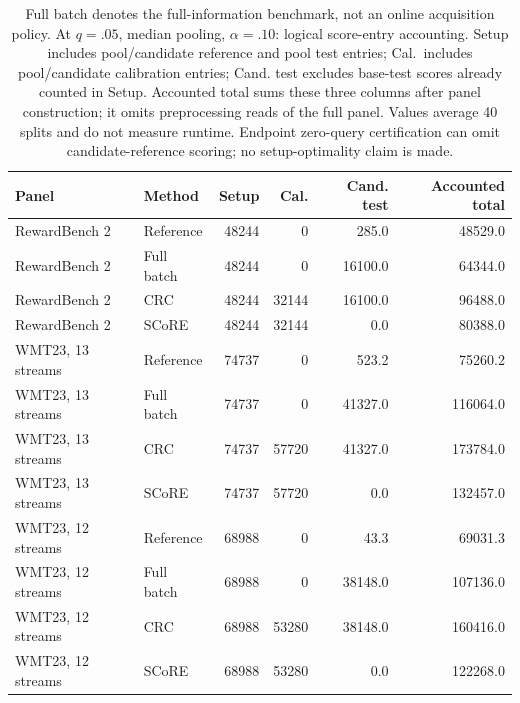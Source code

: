 \begin{table}[t]
\centering\small
\begin{tabular}{llrrrr}
\toprule
Panel & Method & Setup & Cal. & Cand. test & Accounted total \\
\midrule
RewardBench 2 & Reference & 48244 & 0 & 285.0 & 48529.0 \\
RewardBench 2 & Full batch & 48244 & 0 & 16100.0 & 64344.0 \\
RewardBench 2 & CRC & 48244 & 32144 & 16100.0 & 96488.0 \\
RewardBench 2 & SCoRE & 48244 & 32144 & 0.0 & 80388.0 \\
WMT23, 13 streams & Reference & 74737 & 0 & 523.2 & 75260.2 \\
WMT23, 13 streams & Full batch & 74737 & 0 & 41327.0 & 116064.0 \\
WMT23, 13 streams & CRC & 74737 & 57720 & 41327.0 & 173784.0 \\
WMT23, 13 streams & SCoRE & 74737 & 57720 & 0.0 & 132457.0 \\
WMT23, 12 streams & Reference & 68988 & 0 & 43.3 & 69031.3 \\
WMT23, 12 streams & Full batch & 68988 & 0 & 38148.0 & 107136.0 \\
WMT23, 12 streams & CRC & 68988 & 53280 & 38148.0 & 160416.0 \\
WMT23, 12 streams & SCoRE & 68988 & 53280 & 0.0 & 122268.0 \\
\bottomrule
\end{tabular}
\caption{Full batch denotes the full-information benchmark, not an online acquisition policy. At $q=.05$, median pooling, $\alpha=.10$: logical score-entry accounting. Setup includes pool/candidate reference and pool test entries; Cal.\ includes pool/candidate calibration entries; Cand. test excludes base-test scores already counted in Setup. Accounted total sums these three columns after panel construction; it omits preprocessing reads of the full panel. Values average 40 splits and do not measure runtime. Endpoint zero-query certification can omit candidate-reference scoring; no setup-optimality claim is made.}
\label{tab:review-workload}
\end{table}
